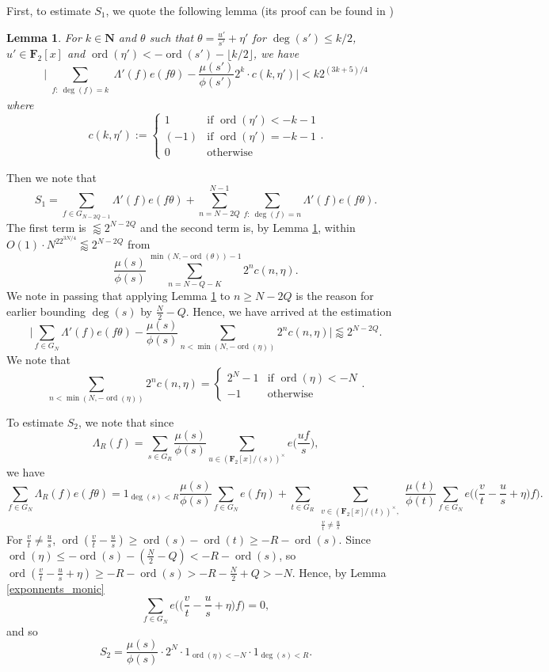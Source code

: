 \documentclass[11pt, reqno]{amsart}
\newtheorem{lemma}[theorem]{Lemma}
\numberwithin{equation}{section}
\newcommand{\zff}{\mathbf{F}_2[x]}
\newcommand{\zffmi}[1]{(\zff/(#1))^{\times}}
\newcommand{\zffmodinvs}{\zffmi{s}}
\newcommand{\zffmodinvt}{\zffmi{t}}
\newcommand\ord{\operatorname{ord}}
\begin{document}
First, to estimate $S_1$, we quote the following lemma (its proof can be found in \cite[Theorem 5.3, Lemma 7.1]{hayes})

\begin{lemma}
\label{grhlemma}
    For $k \in \mathbf{N}$ and $\theta$ such that $\theta=\frac{u'}{s'}+\eta'$ for $\deg(s') \leqslant k/2$, $u' \in \mathbf{F}_2[x]$ and $\ord(\eta') < -\ord(s')- \lfloor k/2 \rfloor$, we have $$\bigg| \sum_{\substack{f: \ \deg(f)=k}} \Lambda'(f) e(f \theta) - \frac{\mu(s')}{\phi(s')} 2^k \cdot c(k, \eta') \bigg| < k2^{(3k+5)/4}$$ where $$c(k, \eta'):=\begin{cases}
        1 & \text{if } \ord(\eta')<-k-1\\
        (-1) & \text{if } \ord(\eta')=-k-1\\
        0 & \text{otherwise}
    \end{cases}.$$
\end{lemma}

Then we note that
$$S_1=\sum_{f \in G_{N-2Q-1}}\Lambda'(f)e(f\theta)+\sum_{n=N-2Q}^{N-1}\sum_{f: \ \deg(f)=n}\Lambda'(f)e(f\theta).$$ The first term is $\lessapprox 2^{N-2Q}$ and the second term is, by Lemma \ref{grhlemma}, within $O(1)\cdot N^22^{3N/4} \lessapprox 2^{N-2Q}$ from $$\frac{\mu(s)}{\phi(s)}\sum_{n=N-Q-K}^{\min(N, -\ord(\theta))-1}2^nc(n, \eta).$$ We note in passing that applying Lemma \ref{grhlemma} to $n\geqslant N-2Q$ is the reason for earlier bounding $\deg(s)$ by $\frac{N}{2}-Q$. Hence, we have arrived at the estimation
\begin{equation}
\label{equation_1}
    \bigg| \sum_{f \in G_N}\Lambda'(f)e(f\theta) - \frac{\mu(s)}{\phi(s)} \sum_{n < \min(N, -\ord(\eta))}2^n c(n, \eta) \bigg| \lessapprox 2^{N-2Q}.
\end{equation}
We note that
\begin{equation}
\label{equation_2}
    \sum_{n<\min(N, -\ord(\eta))}2^nc(n, \eta)=\begin{cases}
    2^N-1 & \text{if } \ord(\eta) < -N\\
    -1 & \text{otherwise}
\end{cases}.
\end{equation}

To estimate $S_2$, we note that since $$\Lambda_R(f)=\sum_{s \in G_R} \frac{\mu(s)}{\phi(s)} \sum_{u \in \zffmodinvs} e\Big(\frac{uf}{s}\Big),$$ we have $$\sum_{f \in G_N} \Lambda_R(f) e(f \theta)
= 1_{\deg(s) < R} \frac{\mu(s)}{\phi(s)} \sum_{f \in G_N} e(f \eta) + \sum_{t \in G_R} \sum_{\substack{v \in \zffmodinvt, \\ \frac{v}{t} \neq \frac{u}{s}}} \frac{\mu(t)}{\phi(t)} \sum_{f \in G_N} e\Big( \big(\frac{v}{t} - \frac{u}{s} + \eta \big)f \Big).$$
For $\frac{v}{t}\neq \frac{u}{s}$, $\ord(\frac{v}{t}-\frac{u}{s}) \geqslant \ord(s)-\ord(t) \geqslant -R - \ord(s).$ Since $\ord(\eta) \leqslant -\ord(s) - (\frac{N}{2}-Q) < -R - \ord(s)$, so $\ord(\frac{v}{t} - \frac{u}{s} + \eta) \geqslant -R-\ord(s) > -R-\frac{N}{2}+Q>-N$. Hence, by Lemma \ref{exponnents_monic}
$$\sum_{f \in G_N}e\Big( \big(\frac{v}{t} - \frac{u}{s} + \eta \big)f \Big)=0,$$
and so $$S_2=\frac{\mu(s)}{\phi(s)}\cdot 2^N \cdot 1_{\ord(\eta)<-N} \cdot 1_{\deg(s)<R}.$$
\end{document}
